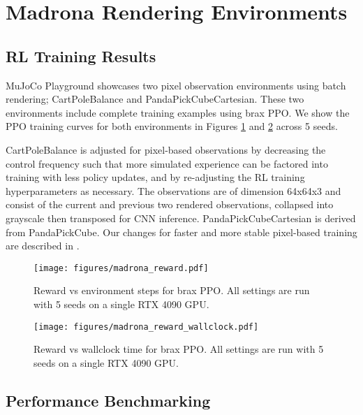 \section{Madrona Rendering Environments}
\label{appendix:MadronaMJXBenchmark}

\subsection{RL Training Results}
\label{sec:madrona_training_curves}

MuJoCo Playground showcases two pixel observation environments using batch rendering; CartPoleBalance and PandaPickCubeCartesian. These two environments include complete training examples using brax PPO. We show the PPO training curves for both environments in Figures \ref{fig:madrona_step_reward} and \ref{fig:madrona_time_reward} across 5 seeds.

CartPoleBalance is adjusted for pixel-based observations by decreasing the control frequency such that more simulated experience can be factored into training with less policy updates, and by re-adjusting the RL training hyperparameters as necessary. The observations are of dimension 64x64x3 and consist of the current and previous two rendered observations, collapsed into grayscale then transposed for CNN inference. PandaPickCubeCartesian is derived from PandaPickCube. Our changes for faster and more stable pixel-based training are described in .

\begin{figure}[ht]
    \centering
    \texttt{[image: figures/madrona\_reward.pdf]}
    \caption{\small Reward vs environment steps for brax PPO. All settings are run with 5 seeds on a single RTX 4090 GPU.}
    \label{fig:madrona_step_reward}
\end{figure}

\begin{figure}[ht]
    \centering
    \texttt{[image: figures/madrona\_reward\_wallclock.pdf]}
    \caption{\small Reward vs wallclock time for brax PPO. All settings are run with 5 seeds on a single RTX 4090 GPU.}
    \label{fig:madrona_time_reward}
\end{figure}

\subsection{Performance Benchmarking}
\label{sec:madrona_benchmarking}

